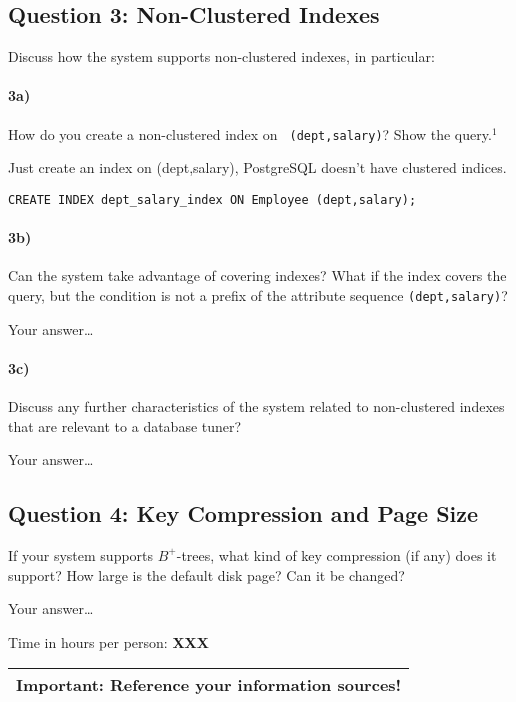 \documentclass[11pt]{scrartcl}
\begin{document}
\subsection*{Question 3: Non-Clustered Indexes}

Discuss how the system supports non-clustered indexes, in
particular:

\paragraph{3a)} How do you create a non-clustered index on {\tt
  (dept,salary)}? Show the query.$^1$

\smallskip

Just create an index on (dept,salary), PostgreSQL doesn't have clustered indices.

{\small
\begin{verbatim}
CREATE INDEX dept_salary_index ON Employee (dept,salary);
\end{verbatim}
}

\paragraph{3b)} Can the system take advantage of covering indexes? What if the
index covers the query, but the condition is not a prefix of the
attribute sequence {\tt (dept,salary)}?


\smallskip

Your answer\dots

\paragraph{3c)} Discuss any further characteristics of the system related to
non-clustered indexes that are relevant to a database tuner?

\smallskip

Your answer\dots

\subsection*{Question 4: Key Compression and Page Size} If your system
supports $B^+$-trees, what kind of key compression (if any) does it
support?  How large is the default disk page? Can it be changed?


\smallskip

Your answer\dots


\bigskip

\noindent Time in hours per person: {\bf XXX}

\bigskip

\begin{center}
  \begin{tabular}{c}
    \hline
    {\bf Important:} Reference your information sources!
    \\\hline
  \end{tabular}
\end{center}
\end{document}
